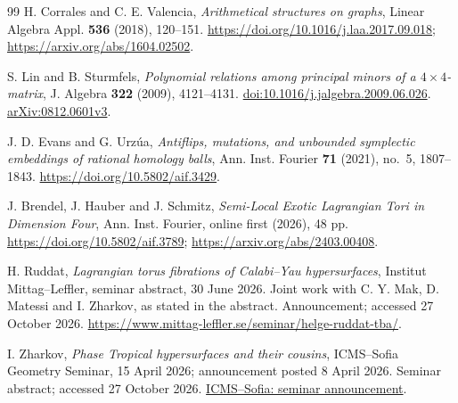 \begin{thebibliography}{99}
H. Corrales and C. E. Valencia,
\emph{Arithmetical structures on graphs},
Linear Algebra Appl. \textbf{536} (2018), 120--151.
\url{https://doi.org/10.1016/j.laa.2017.09.018};
\url{https://arxiv.org/abs/1604.02502}.



S. Lin and B. Sturmfels,
\emph{Polynomial relations among principal minors of a $4\times4$-matrix},
J. Algebra \textbf{322} (2009), 4121--4131.
\href{https://doi.org/10.1016/j.jalgebra.2009.06.026}{doi:10.1016/j.jalgebra.2009.06.026}.
\href{https://arxiv.org/abs/0812.0601}{arXiv:0812.0601v3}.


J. D. Evans and G. Urz\'ua,
\emph{Antiflips, mutations, and unbounded symplectic embeddings of rational homology balls},
Ann. Inst. Fourier \textbf{71} (2021), no.~5, 1807--1843.
\url{https://doi.org/10.5802/aif.3429}.

J. Brendel, J. Hauber and J. Schmitz,
\emph{Semi-Local Exotic Lagrangian Tori in Dimension Four},
Ann. Inst. Fourier, online first (2026), 48 pp.
\url{https://doi.org/10.5802/aif.3789};
\url{https://arxiv.org/abs/2403.00408}.

H. Ruddat,
\emph{Lagrangian torus fibrations of Calabi--Yau hypersurfaces},
Institut Mittag--Leffler, seminar abstract, 30 June 2026.
Joint work with C. Y. Mak, D. Matessi and I. Zharkov, as stated in the abstract.
Announcement; accessed 27 October 2026.
\url{https://www.mittag-leffler.se/seminar/helge-ruddat-tba/}.

I. Zharkov,
\emph{Phase Tropical hypersurfaces and their cousins},
ICMS--Sofia Geometry Seminar, 15 April 2026; announcement posted 8 April 2026.
Seminar abstract; accessed 27 October 2026.
\href{https://icms.bg/phase-tropical-hypersurfaces-and-their-cousins-geometry-seminar-talk-by-ilia-zharkov/}{ICMS--Sofia: seminar announcement}.

\end{thebibliography}
